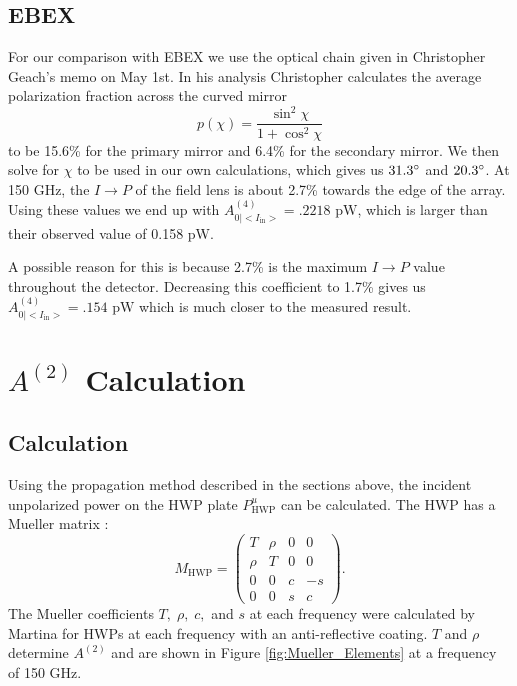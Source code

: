 \documentclass{article}
\theoremstyle{remark}
\newcommand{\tab}{\hspace*{2em}}
\renewcommand{\t}[1]{\text{#1}}
\newcommand{\AI}{A^{(4)}_{0|<I_{\t{in}}>}}
\newcommand{\A}[1]{A^{(#1)}}
\newcommand{\ip}{$I\rightarrow P$ }
\begin{document}
\subsection{EBEX}


\tab For our comparison with EBEX we use the optical chain given in Christopher Geach's memo on May 1st.
In his analysis Christopher calculates the average polarization fraction across the curved mirror
\[p(\chi) = \frac{\sin^2 \chi}{1 + \cos^2 \chi}\]
to be 15.6\% for the primary mirror and 6.4\% for the secondary mirror. 
We then solve for $\chi$ to be used in our own calculations, which gives us $31.3\degree$ and $20.3 \degree$.
At 150 GHz, the \ip of the field lens is about 2.7\% towards the edge of the array.
Using these values we end up with $\AI = .2218 \t{ pW}$, which is larger than their observed value of 0.158 pW.

\tab A possible reason for this is because 2.7\% is the maximum \ip value throughout the detector. 
Decreasing this coefficient to 1.7\% gives us $\AI = .154 \t{ pW}$ which is much closer to the measured result.





\section{$\A2$ Calculation}
\subsection{Calculation}
\tab Using the propagation method described in the sections above, the incident unpolarized power on the HWP plate $P^u_\t{HWP}$ can be calculated. 
The HWP has a Mueller matrix :
\[
M_\t{HWP} = \left(
\begin{array}{cccc}
T & \rho & 0 & 0 \\
\rho & T & 0 & 0 \\
0 & 0 & c & -s\\
0 & 0 & s & c
\end{array}
\right).
\]
The Mueller coefficients $T,\; \rho,\;c,$ and $s$ at each frequency were calculated by Martina for HWPs at each frequency with an anti-reflective coating.
$T$ and $\rho$ determine $\A2$ and are shown in Figure \ref{fig:Mueller_Elements} at a frequency of 150 GHz.
\end{document}
